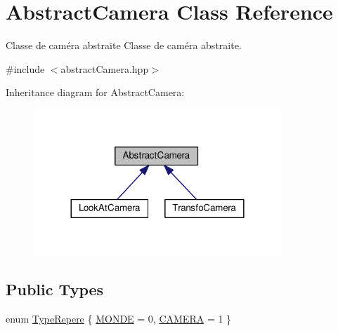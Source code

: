 \hypertarget{class_abstract_camera}{\section{Abstract\+Camera Class Reference}
\label{class_abstract_camera}
}


Classe de caméra abstraite Classe de caméra abstraite.  




{\ttfamily \#include $<$abstract\+Camera.\+hpp$>$}



Inheritance diagram for Abstract\+Camera\+:
\nopagebreak
\begin{figure}[H]
\begin{center}
\leavevmode
\includegraphics[width=264pt]{class_abstract_camera__inherit__graph}
\end{center}
\end{figure}
\subsection*{Public Types}
\begin{DoxyCompactItemize}
\item 
enum \hyperlink{class_abstract_camera_a4d3cc29d2eb150eada1bb387648eae98}{Type\+Repere} \{ \hyperlink{class_abstract_camera_a4d3cc29d2eb150eada1bb387648eae98a4136744a39efe4b86f6743eecc488eb8}{M\+O\+N\+D\+E} = 0, 
\hyperlink{class_abstract_camera_a4d3cc29d2eb150eada1bb387648eae98a7fc33f57f9cabf6771b5fdfa9c64494c}{C\+A\+M\+E\+R\+A} = 1
 \}
\end{DoxyCompactItemize}
